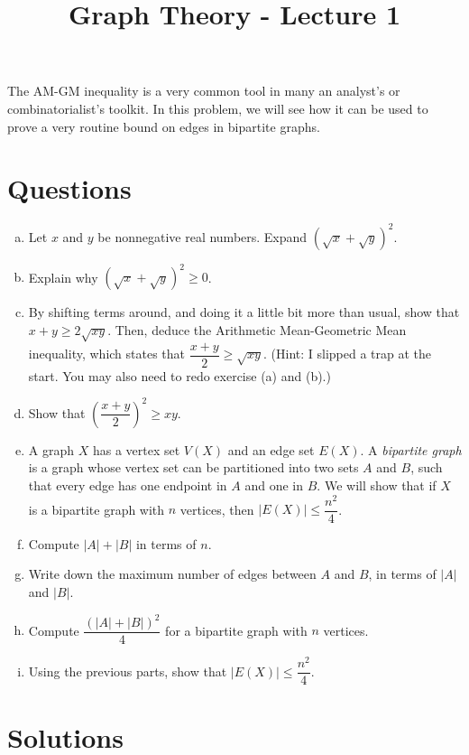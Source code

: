 \documentclass[12pt]{article}
\title{Graph Theory - Lecture 1}
\author{}
\date{}
\begin{document}
\maketitle

The AM-GM inequality is a very common tool in many an analyst's or combinatorialist's toolkit.
In this problem, we will see how it can be used to prove a very routine bound on edges in bipartite graphs.

\section*{Questions}

\begin{enumerate}[(a)]

  \item Let $x$ and $y$ be nonnegative real numbers. Expand $(\sqrt{x} + \sqrt{y})^2$.
  \item Explain why $(\sqrt{x} + \sqrt{y})^2 \geq 0$.
  \item By shifting terms around, and doing it a little bit more than usual, show that $x + y \geq 2\sqrt{xy}$. Then, deduce the Arithmetic Mean-Geometric Mean inequality,
  which states that $\dfrac{x+y}{2} \geq \sqrt{xy}$. (Hint: I slipped a trap at the start. You may also need to redo exercise (a) and (b).)
  \item Show that $\left(\dfrac{x+y}{2}\right)^2 \geq xy$.
  \item A graph $X$ has a vertex set $V(X)$ and an edge set $E(X)$. A \textit{bipartite graph}
  is a graph whose vertex set can be partitioned into two sets $A$ and $B$,
  such that every edge has one endpoint in $A$ and one in $B$.
  We will show that if $X$ is a bipartite graph with $n$ vertices,
  then $|E(X)| \leq \dfrac{n^2}{4}$.
  \item Compute $|A| + |B|$ in terms of $n$.
  \item Write down the maximum number of edges between $A$ and $B$, in terms of $|A|$ and $|B|$.
  \item Compute $\dfrac{(|A|+|B|)^2}{4}$ for a bipartite graph with $n$ vertices.
  \item Using the previous parts, show that $|E(X)| \leq \dfrac{n^2}{4}$.

\end{enumerate}

\newpage
\section*{Solutions}
\end{document}
